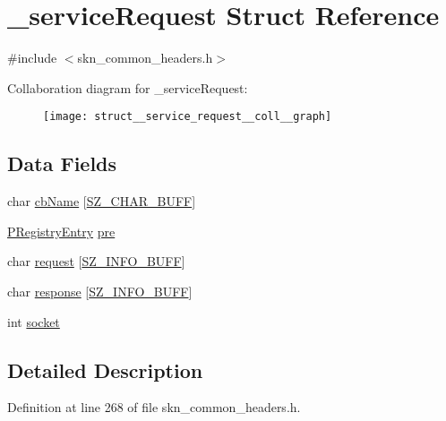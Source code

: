 \hypertarget{struct__service_request}{}\section{\+\_\+service\+Request Struct Reference}
\label{struct__service_request}


{\ttfamily \#include $<$skn\+\_\+common\+\_\+headers.\+h$>$}



Collaboration diagram for \+\_\+service\+Request\+:\nopagebreak
\begin{figure}[H]
\begin{center}
\leavevmode
\texttt{[image: struct\_\_service\_request\_\_coll\_\_graph]}
\end{center}
\end{figure}
\subsection*{Data Fields}
\begin{DoxyCompactItemize}
\item 
char \hyperlink{struct__service_request_aab7831722782ba05f0c94087598a941e}{cb\+Name} \mbox{[}\hyperlink{skn__common__headers_8h_a8d2978ad614b0de81c60483e706d9306}{S\+Z\+\_\+\+C\+H\+A\+R\+\_\+\+B\+U\+FF}\mbox{]}
\item 
\hyperlink{skn__common__headers_8h_ac4f78e564b456af8e033cbc1275db23e}{P\+Registry\+Entry} \hyperlink{struct__service_request_acf8d45e7f9cb65b555217aae74cd72c5}{pre}
\item 
char \hyperlink{struct__service_request_ad347b2a07388ec9d9d33756f1a1ef235}{request} \mbox{[}\hyperlink{skn__common__headers_8h_a442d5e93bd9c9d8eb4532aba62b5f86c}{S\+Z\+\_\+\+I\+N\+F\+O\+\_\+\+B\+U\+FF}\mbox{]}
\item 
char \hyperlink{struct__service_request_ad4e98b9d21fad17ba82dba6a9b5f6562}{response} \mbox{[}\hyperlink{skn__common__headers_8h_a442d5e93bd9c9d8eb4532aba62b5f86c}{S\+Z\+\_\+\+I\+N\+F\+O\+\_\+\+B\+U\+FF}\mbox{]}
\item 
int \hyperlink{struct__service_request_aa867fef3928c7511f50a494662311d13}{socket}
\end{DoxyCompactItemize}


\subsection{Detailed Description}


Definition at line 268 of file skn\+\_\+common\+\_\+headers.\+h.



